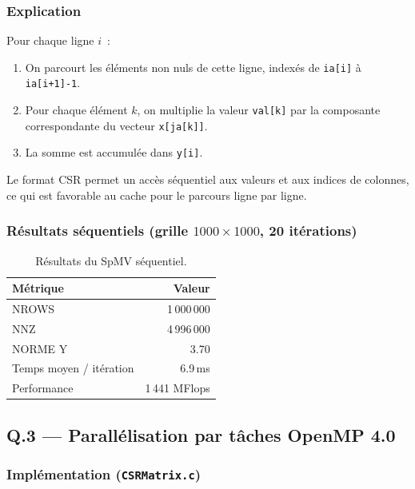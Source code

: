 \documentclass[12pt,a4paper]{article}
\begin{document}
\subsubsection{Explication}

Pour chaque ligne $i$~:
\begin{enumerate}
  \item On parcourt les éléments non nuls de cette ligne, indexés de \texttt{ia[i]} à \texttt{ia[i+1]-1}.
  \item Pour chaque élément $k$, on multiplie la valeur \texttt{val[k]} par la composante correspondante du vecteur \texttt{x[ja[k]]}.
  \item La somme est accumulée dans \texttt{y[i]}.
\end{enumerate}

Le format CSR permet un accès séquentiel aux valeurs et aux indices de colonnes, ce qui est favorable au cache pour le parcours ligne par ligne.

\subsubsection{Résultats séquentiels (grille $1000 \times 1000$, 20 itérations)}

\begin{table}[h]
\centering
\begin{tabular}{lr}
\toprule
\textbf{Métrique} & \textbf{Valeur} \\
\midrule
NROWS                     & 1\,000\,000 \\
NNZ                       & 4\,996\,000 \\
NORME Y                   & 3.70 \\
Temps moyen / itération   & 6.9\,ms \\
Performance               & 1\,441 MFlops \\
\bottomrule
\end{tabular}
\caption{Résultats du SpMV séquentiel.}
\end{table}

\subsection{Q.3 --- Parallélisation par tâches OpenMP 4.0}

\subsubsection{Implémentation (\texttt{CSRMatrix.c})}
\end{document}
